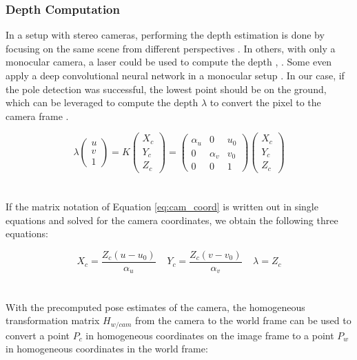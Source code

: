\subsubsection{Depth Computation}
In a setup with stereo cameras, performing the depth estimation is done by focusing on the same scene from different perspectives \citep{shan2011depth}. In others, with only a monocular camera, a laser could be used to compute the depth \citep{sun2010research}, \citep{yan2003mobile}. Some even apply a deep convolutional neural network in a monocular setup \citep{yin2017scale}. In our case, if the pole detection was successful, the lowest point should be on the ground, which can be leveraged to compute the depth $\lambda$ to convert the pixel to the camera frame \citep{namazi2022geolocation}.

\begin{equation}
 \lambda \begin{pmatrix} u \\ v \\ 1 \end{pmatrix} = K \begin{pmatrix} X_c \\ Y_c\\ Z_c \end{pmatrix} =  \begin{pmatrix} \alpha_u & 0 & u_0\\ 0 & \alpha_v & v_0 \\ 0 & 0 & 1 \end{pmatrix} \begin{pmatrix} X_c \\ Y_c\\ Z_c \end{pmatrix}
\label{eq:cam_coord}
\end{equation}
\\
\\
If the matrix notation of Equation \ref{eq:cam_coord} is written out in single equations and solved for the camera coordinates, we obtain the following three equations:

\begin{equation}
X_c = \frac{Z_c ( u - u_0)}{\alpha_u}  \; \; \; \; Y_c = \frac{Z_c ( v - v_0)}{\alpha_v} \; \; \; \; \lambda = Z_c 
\label{eq:inv_cam_coord}
\end{equation}
\\
\\
With the precomputed pose estimates of the camera, the homogeneous transformation matrix $H_{w/cam}$ from the camera to the world frame can be used to convert a point $P_c$ in homogeneous coordinates on the image frame to a point $P_w$ in homogeneous coordinates in the world frame:

